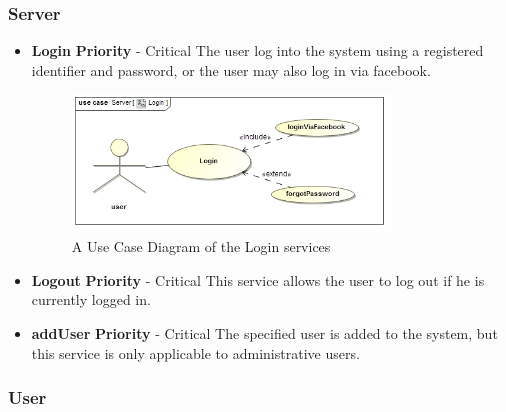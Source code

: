 \documentclass[a4paper,12pt,titlepage]{article}
\begin{document}
		\subsubsection{Server}
			\begin{itemize}
			\item \textbf{Login}
				\newline\textbf{ Priority } - Critical
				\newline The user log into the system using a registered identifier and password, or the user may also log in via facebook.
	
		\begin{figure}[h!]	
 			 \centering
			  \includegraphics[width=0.8\textwidth]{LoginUseCase}
		 	 \caption{A Use Case Diagram of the Login services}
		\end{figure}
	
		\item \textbf{Logout}
				\newline\textbf{ Priority } - Critical
				\newline This service allows the user to log out if he is currently logged in.
			\item \textbf{addUser}
				\newline\textbf{ Priority } - Critical
				\newline The specified user is added to the system, but this service is only applicable to administrative users. 
			\end{itemize}
		\subsubsection{User}
\end{document}
